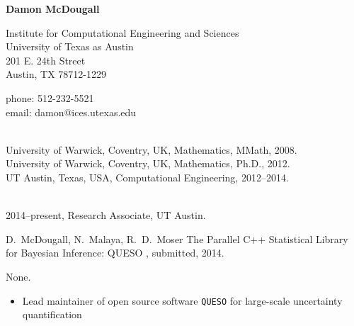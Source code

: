 \documentclass[11pt]{article}
\begin{document}
\begin{center}{\bf\large Damon McDougall}
\end{center}
\vskip 0.1in
\parbox{3.5in}{
Institute for Computational Engineering and Sciences\\
University of Texas as Austin\\
201 E. 24th Street\\
Austin, TX 78712-1229
}
\hfill
\parbox{2.1in}{
phone: 512-232-5521\\
email: damon@ices.utexas.edu} \vskip 0.2in

\vspace{.1in}\\
University of Warwick, Coventry, UK, Mathematics, MMath, 2008.\\
University of Warwick, Coventry, UK, Mathematics, Ph.D., 2012.\\
UT Austin, Texas, USA, Computational Engineering, 2012--2014.

\vspace{.1in}
\vspace{.1in}\\
2014--present, Research Associate, UT Austin.

\vspace{.1in} \vspace{.1in}

D.\ McDougall, N.\ Malaya, R.\ D.\ Moser
\newblock The Parallel C++ Statistical Library for Bayesian Inference: QUESO
, submitted, 2014.

\vspace{.1in} \vspace{.1in}

None.

\vspace{.1in}

\noindent
\begin{itemize}
\item Lead maintainer of open source software \texttt{QUESO} for large-scale
  uncertainty quantification
\end{itemize}
\end{document}
